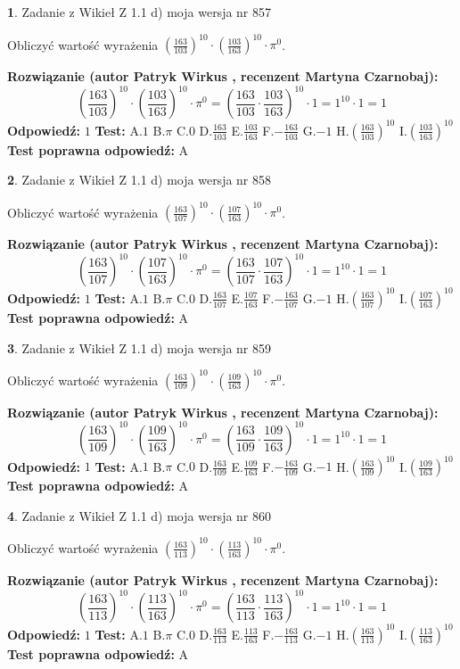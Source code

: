 \documentclass[12pt, a4paper]{article}
\theoremstyle{definition} %
\newtheorem{zad}{}
\newcommand{\zadStart}[1]{\begin{zad}#1\newline}
\newcommand{\zadStop}{\end{zad}}
\newcommand{\rozwStart}[2]{\noindent \textbf{Rozwiązanie (autor #1 , recenzent #2): }\newline}
\newcommand{\rozwStop}{\newline}
\newcommand{\odpStart}{\noindent \textbf{Odpowiedź:}\newline}
\newcommand{\odpStop}{\newline}
\newcommand{\testStart}{\noindent \textbf{Test:}\newline}
\newcommand{\testStop}{\newline}
\newcommand{\kluczStart}{\noindent \textbf{Test poprawna odpowiedź:}\newline}
\newcommand{\kluczStop}{\newline}
\begin{document}
\zadStart{Zadanie z Wikieł Z 1.1 d) moja wersja nr 857}

Obliczyć wartość wyrażenia $(\frac{163}{103})^{10} \cdot (\frac{103}{163})^{10} \cdot \pi^{0}$.
\zadStop
\rozwStart{Patryk Wirkus}{Martyna Czarnobaj}
$$(\frac{163}{103})^{10} \cdot (\frac{103}{163})^{10} \cdot \pi^{0} = (\frac{163}{103} \cdot \frac{103}{163})^{10} \cdot 1 = 1^{10} \cdot 1 = 1$$
\rozwStop
\odpStart
$1$
\odpStop
\testStart
A.$1$ B.$\pi$ C.$0$ D.$\frac{163}{103}$ E.$\frac{103}{163}$
F.$-\frac{163}{103}$ G.$-1$
H.$(\frac{163}{103})^{10}$
I.$(\frac{103}{163})^{10}$
\testStop
\kluczStart
A
\kluczStop



\zadStart{Zadanie z Wikieł Z 1.1 d) moja wersja nr 858}

Obliczyć wartość wyrażenia $(\frac{163}{107})^{10} \cdot (\frac{107}{163})^{10} \cdot \pi^{0}$.
\zadStop
\rozwStart{Patryk Wirkus}{Martyna Czarnobaj}
$$(\frac{163}{107})^{10} \cdot (\frac{107}{163})^{10} \cdot \pi^{0} = (\frac{163}{107} \cdot \frac{107}{163})^{10} \cdot 1 = 1^{10} \cdot 1 = 1$$
\rozwStop
\odpStart
$1$
\odpStop
\testStart
A.$1$ B.$\pi$ C.$0$ D.$\frac{163}{107}$ E.$\frac{107}{163}$
F.$-\frac{163}{107}$ G.$-1$
H.$(\frac{163}{107})^{10}$
I.$(\frac{107}{163})^{10}$
\testStop
\kluczStart
A
\kluczStop



\zadStart{Zadanie z Wikieł Z 1.1 d) moja wersja nr 859}

Obliczyć wartość wyrażenia $(\frac{163}{109})^{10} \cdot (\frac{109}{163})^{10} \cdot \pi^{0}$.
\zadStop
\rozwStart{Patryk Wirkus}{Martyna Czarnobaj}
$$(\frac{163}{109})^{10} \cdot (\frac{109}{163})^{10} \cdot \pi^{0} = (\frac{163}{109} \cdot \frac{109}{163})^{10} \cdot 1 = 1^{10} \cdot 1 = 1$$
\rozwStop
\odpStart
$1$
\odpStop
\testStart
A.$1$ B.$\pi$ C.$0$ D.$\frac{163}{109}$ E.$\frac{109}{163}$
F.$-\frac{163}{109}$ G.$-1$
H.$(\frac{163}{109})^{10}$
I.$(\frac{109}{163})^{10}$
\testStop
\kluczStart
A
\kluczStop



\zadStart{Zadanie z Wikieł Z 1.1 d) moja wersja nr 860}

Obliczyć wartość wyrażenia $(\frac{163}{113})^{10} \cdot (\frac{113}{163})^{10} \cdot \pi^{0}$.
\zadStop
\rozwStart{Patryk Wirkus}{Martyna Czarnobaj}
$$(\frac{163}{113})^{10} \cdot (\frac{113}{163})^{10} \cdot \pi^{0} = (\frac{163}{113} \cdot \frac{113}{163})^{10} \cdot 1 = 1^{10} \cdot 1 = 1$$
\rozwStop
\odpStart
$1$
\odpStop
\testStart
A.$1$ B.$\pi$ C.$0$ D.$\frac{163}{113}$ E.$\frac{113}{163}$
F.$-\frac{163}{113}$ G.$-1$
H.$(\frac{163}{113})^{10}$
I.$(\frac{113}{163})^{10}$
\testStop
\kluczStart
A
\kluczStop
\end{document}
